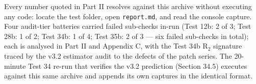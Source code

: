 \documentclass[10pt]{article}
\begin{document}
Every number quoted in Part II resolves against this archive without executing any code: locate the test folder, open \texttt{report.md}, and read the console capture. Four audit-tier batteries carried failed sub-checks in-run (Test 12b: 2 of 3; Test 28b: 1 of 2; Test 34b: 1 of 4; Test 35b: 2 of 3 --- six failed sub-checks in total); each is analysed in Part II and Appendix C, with the Test 34b R$_2$ signature traced by the v3.2 estimator audit to the defects of the patch series. The 20-minute Test 34 re-run that verifies the v3.2 prediction (Section 34.5) executes against this same archive and appends its own captures in the identical format.
\end{document}
